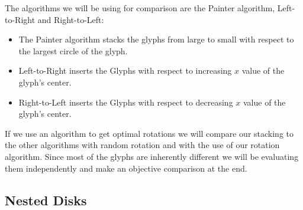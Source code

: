 \documentclass[a4paper,11pt]{article}
\begin{document}
The algorithms we will be using for comparison are the Painter algorithm, Left-to-Right and Right-to-Left:

\begin{itemize}
  \item The Painter algorithm stacks the glyphs from large to small with respect to the largest circle of the glyph.
  \item Left-to-Right inserts the Glyphs with respect to increasing $x$ value of the glyph's center.
  \item Right-to-Left inserts the Glyphs with respect to decreasing $x$ value of the glyph's center.
\end{itemize}

If we use an algorithm to get optimal rotations we will compare our stacking to the other algorithms with random rotation and with the use of our rotation algorithm. Since most of the glyphs are inherently different we will be evaluating them independently and make an objective comparison at the end.


\subsection*{Nested Disks}
\end{document}
